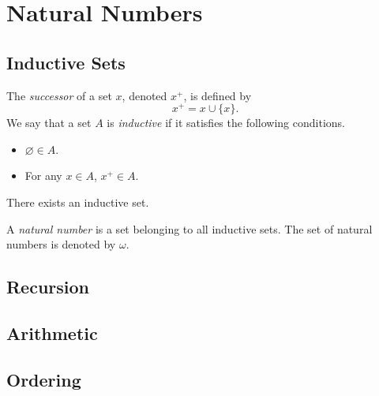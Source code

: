 \chapter{Natural Numbers}
\section{Inductive Sets}
\begin{definition}
  The \emph{successor} of a set $x$, denoted $x^+$, is defined by
  \begin{equation*}
    x^+ = x \cup \{x\}.
  \end{equation*}
  We say that a set $A$ is \emph{inductive} if it satisfies the following
  conditions.
  \begin{itemize}
    \item $\varnothing \in A$.
    \item For any $x \in A$, $x^+ \in A$.
  \end{itemize}
\end{definition}

\begin{axiom}[Infinity]
  There exists an inductive set.
\end{axiom}

\begin{definition}
  A \emph{natural number} is a set belonging to all inductive sets.
  The set of natural numbers is denoted by $\omega$.
\end{definition}

\section{Recursion}

\section{Arithmetic}

\section{Ordering}